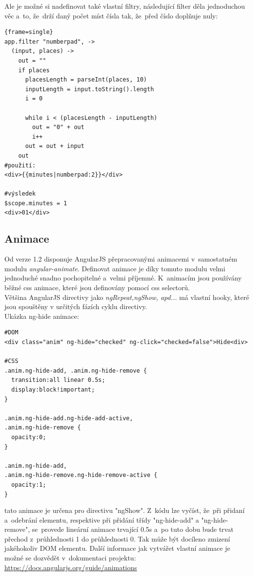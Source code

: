 \documentclass[a4paper,12pt,twoside,BCOR=10mm]{article}
\renewcommand{\it}[1]{\textit{#1}}    %
\newenvironment{codeframe}{%
  \begin{Sbox} 
    \begin{minipage} 
      {\columnwidth-\leftmargin-\rightmargin-2\fboxsep-2\fboxrule-4pt} 
}{%

  \end{minipage} 
  \end{Sbox} 
  \begin{center} 
    \fcolorbox{black}{codeback}{\TheSbox} 
  \end{center} 
}
\begin{document}
Ale je možné si nadefinovat také vlastní filtry, následující filter děla jednoduchou věc a~to, že~drží daný počet míst čísla tak, že~před číslo doplňuje nuly:
     \begin{codeframe} 
      \begin{Verbatim}{frame=single}
app.filter "numberpad", ->
  (input, places) ->
    out = ""
    if places
      placesLength = parseInt(places, 10)
      inputLength = input.toString().length
      i = 0

      while i < (placesLength - inputLength)
        out = "0" + out
        i++
      out = out + input
    out
#použití:
<div>{{minutes|numberpad:2}}</div>

#výsledek
$scope.minutes = 1
<div>01</div>
\end{Verbatim} 
    \end{codeframe}

\subsection{Animace}
Od verze 1.2 disponuje AngularJS přepracovanými animacemi v~samostatném modulu \it{angular-animate}. Definovat animace je díky tomuto modulu velmi jednoduché snadno pochopitelné a~velmi příjemné. K~animacím jsou používány běžné css animace, které jsou definovány pomocí css selectorů. \cite{angularAnimation}\\
Většina AngularJS directivy jako \it{ngRepeat,ngShow, apd...} má vlastní hooky, které jsou spouštěny v určitých fázích cyklu directivy.\cite{ngBOOK}\\

Ukázka ng-hide animace:
\begin{codeframe}
  \begin{verbatim}
#DOM
<div class="anim" ng-hide="checked" ng-click="checked=false">Hide<div>

#CSS
.anim.ng-hide-add, .anim.ng-hide-remove {
  transition:all linear 0.5s;
  display:block!important;
}

.anim.ng-hide-add.ng-hide-add-active,
.anim.ng-hide-remove {
  opacity:0;
}

.anim.ng-hide-add,
.anim.ng-hide-remove.ng-hide-remove-active {
  opacity:1;
}
  \end{verbatim}
\end{codeframe}
tato animace je určena pro directivu "ngShow". Z~kódu lze vyčíst, že~při přidaní a~odebrání elementu, respektive při přidání třídy "ng-hide-add" a "ng-hide-remove", se~provede lineární animace trvající 0.5s a~po tuto dobu bude trvat přechod z~průhlednosti 1 do průhlednosti 0. Tak může být docíleno zmizení jakéhokoliv DOM elementu.\cite{ngBOOK}
Další informace jak vytvářet vlastní animace je možné se dozvědět v~dokumentaci projektu: \href{https://docs.angularjs.org/guide/animations}{https://docs.angularjs.org/guide/animations}\\
\end{document}
